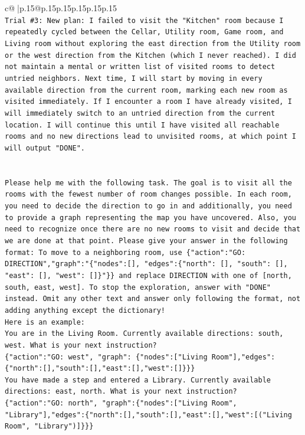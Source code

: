 \documentclass{article}
\begin{document}
{\begin{supertabular}{c@{$\;$}|p{.15\linewidth}@{}p{.15\linewidth}p{.15\linewidth}p{.15\linewidth}p{.15\linewidth}p{.15\linewidth}}
{{{\\ 
\texttt{Trial \#3: New plan: I failed to visit the "Kitchen" room because I repeatedly cycled between the Cellar, Utility room, Game room, and Living room without exploring the east direction from the Utility room or the west direction from the Kitchen (which I never reached). I did not maintain a mental or written list of visited rooms to detect untried neighbors. Next time, I will start by moving in every available direction from the current room, marking each new room as visited immediately. If I encounter a room I have already visited, I will immediately switch to an untried direction from the current location. I will continue this until I have visited all reachable rooms and no new directions lead to unvisited rooms, at which point I will output "DONE".} \\
\\ 
\\ 
\texttt{Please help me with the following task. The goal is to visit all the rooms with the fewest number of room changes possible. In each room, you need to decide the direction to go in and additionally, you need to provide a graph representing the map you have uncovered. Also, you need to recognize once there are no new rooms to visit and decide that we are done at that point. Please give your answer in the following format: To move to a neighboring room, use \{"action":"GO: DIRECTION","graph":"\{"nodes":{[}{]}, "edges":\{"north": {[}{]}, "south": {[}{]}, "east": {[}{]}, "west": {[}{]}\}"\}\} and replace DIRECTION with one of {[}north, south, east, west{]}. To stop the exploration, answer with "DONE" instead. Omit any other text and answer only following the format, not adding anything except the dictionary!} \\
\texttt{Here is an example: } \\
\texttt{You are in the Living Room. Currently available directions: south, west. What is your next instruction?} \\
\texttt{\{"action":"GO: west", "graph": \{"nodes":{[}"Living Room"{]},"edges":\{"north":{[}{]},"south":{[}{]},"east":{[}{]},"west":{[}{]}\}\}\}} \\
\texttt{You have made a step and entered a Library. Currently available directions: east, north. What is your next instruction?} \\
\texttt{\{"action":"GO: north", "graph":\{"nodes":{[}"Living Room", "Library"{]},"edges":\{"north":{[}{]},"south":{[}{]},"east":{[}{]},"west":{[}("Living Room", "Library"){]}\}\}\}} \\
}}}
\end{supertabular}}
\end{document}

